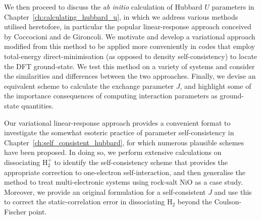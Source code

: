We then proceed to discuss the {\it ab initio} calculation of 
Hubbard $U$ parameters in 
Chapter~\ref{ch:calculating_hubbard_u}, 
in which we address various 
methods utilised heretofore, 
in particular the popular linear-response approach 
conceived by Coccocioni and de Gironcoli.
%
We motivate and develop a 
variational approach modified from this 
method to be applied more conveniently 
in codes that employ total-energy direct-minimisation  
(as opposed to density self-consistency) 
to locate the DFT ground-state.
%
We test this method on a variety of systems
and consider the similarities and differences 
between the two approaches.
%
Finally, 
we devise an equivalent scheme 
to calculate the exchange parameter $J$, 
and highlight some of the importance consequences 
of computing interaction parameters 
as ground-state quantities.
%

Our variational linear-response approach 
provides a convenient format  
to investigate the somewhat esoteric  
practice of parameter self-consistency 
in Chapter~\ref{ch:self_consistent_hubbard}, 
for which numerous plausible 
schemes have been proposed.
%
In doing so, 
we perform extensive calculations 
on dissociating H$_2^+$ 
to identify the self-consistency scheme 
that provides the appropriate 
correction to one-electron self-interaction, 
and then generalise the method 
to treat multi-electronic systems 
using rock-salt NiO as a case study.
%
Moreover, 
we provide an original formulation 
for a self-consistent $J$ 
and use this to correct 
the static-correlation error 
in dissociating H$_2$ 
beyond the Coulson-Fischer point.




